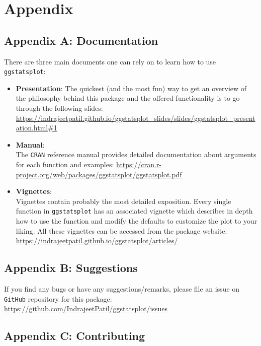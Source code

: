 \documentclass[
]{article}
\begin{document}
\hypertarget{appendix}{%
\section{Appendix}\label{appendix}}

\hypertarget{appendix-a-documentation}{%
\subsection{Appendix A: Documentation}\label{appendix-a-documentation}}

There are three main documents one can rely on to learn how to use
\texttt{ggstatsplot}:

\begin{itemize}
\item
  \textbf{Presentation}:
  The quickest (and the most fun) way to get an overview of
  the philosophy behind this package and the offered functionality is to go
  through the following slides:
  \url{https://indrajeetpatil.github.io/ggstatsplot_slides/slides/ggstatsplot_presentation.html\#1}
\item
  \textbf{Manual}:\\
  The \texttt{CRAN} reference manual provides detailed documentation about arguments
  for each function and examples:
  \url{https://cran.r-project.org/web/packages/ggstatsplot/ggstatsplot.pdf}
\item
  \textbf{Vignettes}:\\
  Vignettes contain probably the most detailed exposition. Every single
  function in \texttt{ggstatsplot} has an associated vignette which describes in
  depth how to use the function and modify the defaults to customize the plot
  to your liking. All these vignettes can be accessed from the package
  website: \url{https://indrajeetpatil.github.io/ggstatsplot/articles/}
\end{itemize}

\hypertarget{appendix-b-suggestions}{%
\subsection{Appendix B: Suggestions}\label{appendix-b-suggestions}}

If you find any bugs or have any suggestions/remarks, please file an issue on
\texttt{GitHub} repository for this package:
\url{https://github.com/IndrajeetPatil/ggstatsplot/issues}

\hypertarget{appendix-c-contributing}{%
\subsection{Appendix C: Contributing}\label{appendix-c-contributing}}
\end{document}
